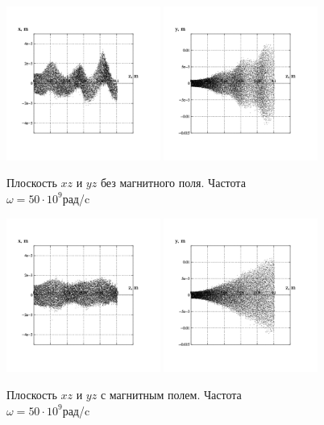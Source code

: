 \documentclass[a4paper,14pt]{extreport} %
\begin{document}
\begin{figure}[c]
	\parbox{0.48\textwidth}{
		\includegraphics[width = 0.45\textwidth]{images/png/without_mf/50xz.png}
		\includegraphics[width = 0.45\textwidth]{images/png/without_mf/50yz.png}
		\caption{Плоскость $xz$ и $yz$ без магнитного поля. Частота \\
			 $\omega = 50\cdot10^9$рад/c}
	}
	\quad
	\parbox{0.48\textwidth}{
		\includegraphics[width = 0.45\textwidth]{images/png/withmf/50xz.png}
		\includegraphics[width = 0.45\textwidth]{images/png/withmf/50yz.png}
		\caption{Плоскость $xz$ и $yz$ с магнитным полем. Частота \\
			$\omega = 50\cdot10^9$рад/c}
	}
\end{figure}
\end{document}

